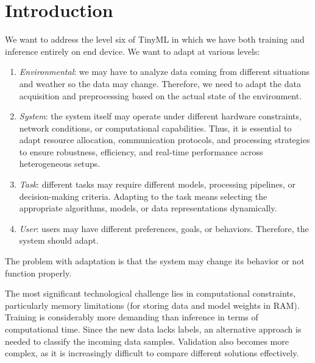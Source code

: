 \section{Introduction}

We want to address the level six of TinyML in which we have both training and inference entirely on end device. 
We want to adapt at various levels: 
\begin{enumerate}
    \item \textit{Environmental}: we may have to analyze data coming from different situations and weather so the data may change. 
        Therefore, we need to adapt the data acquisition and preprocessing based on the actual state of the environment. 
    \item \textit{System}: the system itself may operate under different hardware constraints, network conditions, or computational capabilities. 
        Thus, it is essential to adapt resource allocation, communication protocols, and processing strategies to ensure robustness, efficiency, and real-time performance across heterogeneous setups.  
    \item \textit{Task}: different tasks may require different models, processing pipelines, or decision-making criteria.
        Adapting to the task means selecting the appropriate algorithms, models, or data representations dynamically.  
    \item \textit{User}: users may have different preferences, goals, or behaviors. 
        Therefore, the system should adapt. 
\end{enumerate}
\noindent The problem with adaptation is that the system may change its behavior or not function properly.

The most significant technological challenge lies in computational constraints, particularly memory limitations (for storing data and model weights in RAM).
Training is considerably more demanding than inference in terms of computational time.
Since the new data lacks labels, an alternative approach is needed to classify the incoming data samples.
Validation also becomes more complex, as it is increasingly difficult to compare different solutions effectively.